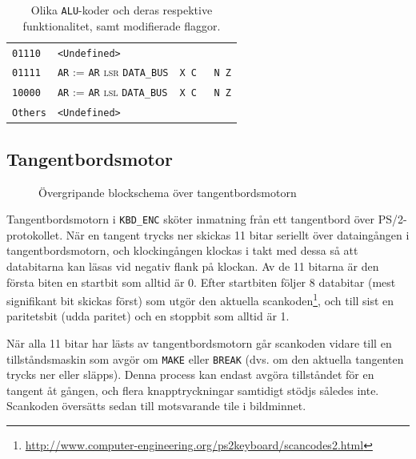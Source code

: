 \documentclass[]{article}
\begin{document}
\begin{table}[H]
\begin{tabular}{llc}
	\texttt{01110}  & \texttt{<Undefined>}                                   &  \\
	\texttt{01111}  & \texttt{AR} := \texttt{AR} \textsc{lsr} \texttt{DATA\_BUS}                       &  \texttt{X C { } N Z}   \\
	\texttt{10000}  & \texttt{AR} := \texttt{AR} \textsc{lsl} \texttt{DATA\_BUS}                       &  \texttt{X C { } N Z}   \\
	\texttt{Others} & \texttt{<Undefined>}                                   &
\end{tabular}
\caption{Olika \texttt{ALU}-koder och deras respektive funktionalitet, samt modifierade flaggor.}
\end{table}

\newpage
\subsection{Tangentbordsmotor}

\begin{figure}[h!]
	\caption{Övergripande blockschema över tangentbordsmotorn}
\end{figure}
\noindent
Tangentbordsmotorn i \texttt{KBD\_ENC} sköter inmatning från ett tangentbord över PS/2-protokollet. När en tangent trycks ner skickas 11 bitar seriellt över dataingången i tangentbordsmotorn, och klockingången klockas i takt med dessa så att databitarna kan läsas vid negativ flank på klockan. Av de 11 bitarna är den första biten en startbit som alltid är 0. Efter startbiten följer 8 databitar (mest signifikant bit skickas först)  som utgör den aktuella scankoden\footnote{\url{http://www.computer-engineering.org/ps2keyboard/scancodes2.html}}, och till sist en paritetsbit (udda paritet) och en stoppbit som alltid är 1.

När alla 11 bitar har lästs av tangentbordsmotorn går scankoden vidare till en tillståndsmaskin som avgör om \texttt{MAKE} eller \texttt{BREAK} (dvs. om den aktuella tangenten trycks ner eller släpps). Denna process kan endast avgöra tillståndet för en tangent åt gången, och flera knapptryckningar samtidigt stödjs således inte. Scankoden översätts sedan till motsvarande tile i bildminnet.
\end{document}
